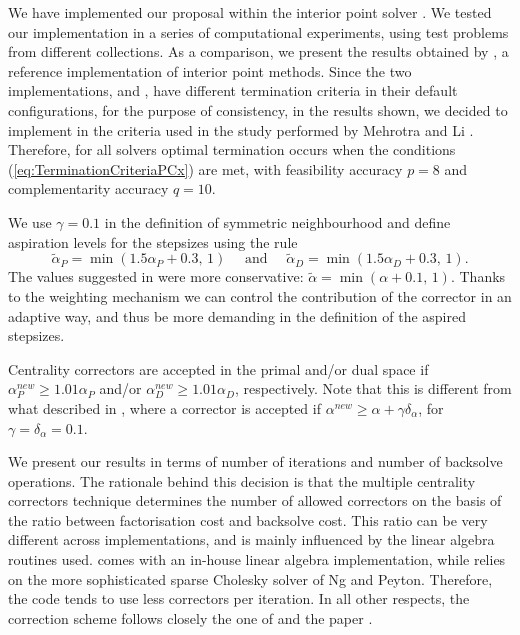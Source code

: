 We have implemented our proposal within the \HOPDM interior point solver 
\cite{HOPDM}. 
%
%
We tested our implementation in a series of computational 
experiments, using test problems from different collections. 
As a comparison, we present the results obtained by \PCx \cite{PCx}, 
a reference implementation of interior point methods. Since the two 
implementations, \PCx and \HOPDM, have different termination criteria 
in their default configurations, for the purpose of consistency,
in the results shown, 
we decided to implement in \HOPDM the criteria used in the study 
performed by Mehrotra and Li \cite{MehrotraLi}.
Therefore, for all solvers optimal termination occurs when the conditions
(\ref{eq:TerminationCriteriaPCx}) are met, with feasibility
accuracy $p=8$ and complementarity accuracy $q = 10$.

We use $\gamma = 0.1$ in the definition of symmetric 
neighbourhood and define aspiration levels for the stepsizes using the rule
\[
  \tilde{\alpha}_{P} = \min(1.5 \alpha_{P} \! + \! 0.3, \, 1) 
  \quad \mbox{ and } \quad
  \tilde{\alpha}_{D} = \min(1.5 \alpha_{D} \! + \! 0.3, \, 1). 
\]
The values suggested in \cite{Gondzio96} were more conservative:
$\tilde{\alpha} = \min (\alpha + 0.1, \, 1)$.
Thanks to the weighting mechanism we can control 
the contribution of the corrector in an adaptive way,
and thus be more demanding in the definition of the aspired stepsizes.

Centrality correctors are accepted in the primal and/or dual space
if ${\alpha}_{P}^{new} \geq 1.01 \alpha_{P}$ 
and/or ${\alpha}_{D}^{new} \geq 1.01 \alpha_{D}$, respectively.
Note that this is different from what described in \cite{Gondzio96}, where
a corrector is accepted if ${\alpha}^{new} \geq \alpha + \gamma\delta_\alpha$, 
for $\gamma = \delta_\alpha = 0.1$.

We present our results in terms of number of iterations and number 
of backsolve operations. The rationale behind this decision is that 
the multiple centrality correctors technique determines the number 
of allowed correctors on the basis of the ratio between factorisation 
cost and backsolve cost. This ratio can be very different across 
implementations, and is mainly influenced by the linear algebra 
routines used. 
\HOPDM comes with an in-house linear algebra implementation, while
\PCx relies on the more sophisticated sparse Cholesky solver
of Ng and Peyton. Therefore, the \PCx code tends to use less 
correctors per iteration.
In all other respects, the correction scheme follows closely the one
of \HOPDM and the paper \cite{Gondzio96}.


